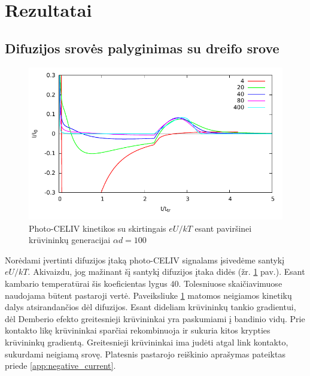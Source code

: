 \section{Rezultatai}



\subsection{Difuzijos srovės palyginimas su dreifo srove}

\begin{figure}[H]
  \centering
    \includegraphics{./media/pdf/diff_drift.pdf}
  \caption{Photo-CELIV kinetikos su skirtingais $eU/kT$ esant paviršinei krūvininkų generacijai $\alpha d = 100$}
  \label{fig:comp}
\end{figure}

Norėdami įvertinti difuzijos įtaką photo-CELIV signalams įsivedėme santykį $eU/kT$. Akivaizdu, jog mažinant šį santykį difuzijos įtaka didės (žr. \ref{fig:comp} pav.). Esant kambario temperatūrai šis koeficientas lygus $40$. Tolesniuose skaičiavimuose naudojama būtent pastaroji vertė.
Paveiksliuke \ref{fig:comp} matomos neigiamos kinetikų dalys atsirandančios dėl difuzijos. Esant dideliam krūvininkų tankio gradientui, dėl Demberio efekto greitesnieji krūvininkai yra paskumiami į bandinio vidų. Prie kontakto likę krūvininkai sparčiai rekombinuoja ir sukuria kitos krypties krūvininkų gradientą. Greitesnieji krūvininkai ima judėti atgal link kontakto, sukurdami neigiamą srovę. Platesnis pastarojo reiškinio aprašymas pateiktas priede \ref{app:negative_current}.

